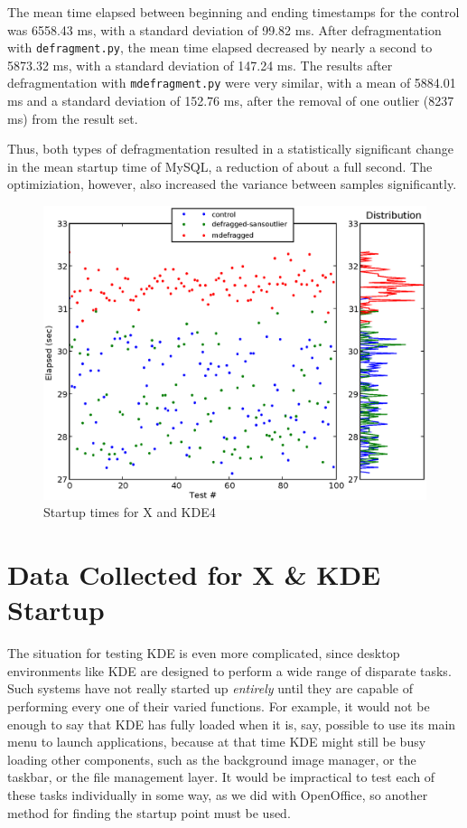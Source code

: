 \documentclass[10pt,twocolumn,letterpaper]{article}
\begin{document}
The mean time elapsed between beginning and ending timestamps for the control was 6558.43 ms, with a standard deviation of 99.82 ms. After defragmentation with \texttt{defragment.py}, the mean time elapsed decreased by nearly a second to 5873.32 ms, with a standard deviation of 147.24 ms. The results after defragmentation with \texttt{mdefragment.py} were very similar, with a mean of 5884.01 ms and a standard deviation of 152.76 ms, after the removal of one outlier (8237 ms) from the result set.

Thus, both types of defragmentation resulted in a statistically significant change in the mean startup time of MySQL, a reduction of about a full second. The optimiziation, however, also increased the variance between samples significantly.

\begin{figure}[!htb]
\includegraphics[scale=0.75]{kde4-chart.eps}
\caption{Startup times for X and KDE4}
\label{kde4chart}
\end{figure}

\section{Data Collected for X \& KDE Startup}

The situation for testing KDE is even more complicated, since desktop environments like KDE are designed
to perform a wide range of disparate tasks. Such systems have not really started up \emph{entirely} until they are capable of performing every one of their varied functions. For example, it would not be enough to say that KDE has fully loaded when it is, say, possible to use its main menu to launch applications, because at that time KDE might still be busy loading other components, such as the background image manager, or the taskbar, or
the file management layer. It would be impractical to test each of these tasks individually in some way,
as we did with OpenOffice, so another method for finding the startup point must be used.
\end{document}
